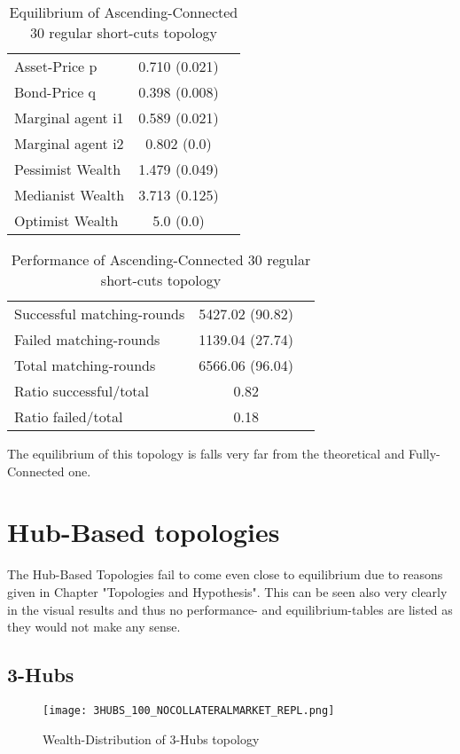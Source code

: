 \documentclass[Bachelorarbeit.tex]{subfiles}
\begin{document}
\begin{table}[H]
	\caption{Equilibrium of Ascending-Connected 30 regular short-cuts topology}
	\centering
	\begin{tabular} { l c r }
		\hline
		Asset-Price p & 0.710 (0.021) \\
		Bond-Price q & 0.398 (0.008) \\
		Marginal agent i1 & 0.589 (0.021) \\
		Marginal agent i2 & 0.802 (0.0) \\
		\hline
		Pessimist Wealth & 1.479 (0.049) \\
		Medianist Wealth & 3.713 (0.125) \\
		Optimist Wealth & 5.0 (0.0) \\
		\hline
	\end{tabular}
\end{table} 

\begin{table}[H]
	\caption{Performance of Ascending-Connected 30 regular short-cuts topology}
	\centering
	\begin{tabular} { l c r }
		\hline
		Successful matching-rounds& 5427.02 (90.82) \\
		Failed matching-rounds & 1139.04 (27.74) \\
		Total matching-rounds & 6566.06 (96.04) \\
		\hline
		Ratio successful/total & 0.82 \\
		Ratio failed/total & 0.18 \\
		\hline
	\end{tabular}
\end{table}

The equilibrium of this topology is falls very far from the theoretical and Fully-Connected one.

\section{Hub-Based topologies} 
The Hub-Based Topologies fail to come even close to equilibrium due to reasons given in Chapter "Topologies and Hypothesis". This can be seen also very clearly in the visual results and thus no performance- and equilibrium-tables are listed as they would not make any sense.

\subsection{3-Hubs}
\begin{figure}[H]
	\centering
  \texttt{[image: 3HUBS\_100\_NOCOLLATERALMARKET\_REPL.png]}
	\caption{Wealth-Distribution of 3-Hubs topology}
	\label{fig:wealth_3HUBS_100_NOCOLLATERALMARKET_REPL}
\end{figure}
\end{document}
